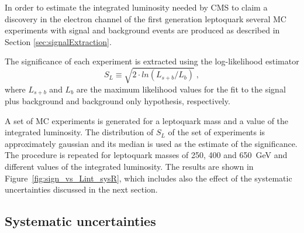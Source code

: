 \documentclass[colclass=cmspaper]{combine}
\begin{document}
\begin{linenumbers}
In order to estimate the integrated luminosity needed by CMS to claim 
a discovery in the electron channel of the first generation leptoquark
several MC experiments with signal and background events are produced
as described in Section \ref{sec:signalExtraction}.

The significance of each experiment is extracted using the log-likelihood estimator 
\begin{displaymath}
S_L \equiv \sqrt{2\cdot ln{(L_{s+b}/L_{b})}}~\mathrm{,}
\end{displaymath}
where $L_{s+b}$ and $L_b$ are the maximum likelihood values for the fit to
the signal plus background and background only hypothesis, respectively.

A set of MC experiments is generated for a leptoquark mass and a value of 
the integrated luminosity.
The distribution of $S_L$ of the set of experiments is approximately gaussian 
and its median is used as the estimate of the significance.
The procedure is repeated for leptoquark masses of 250, 400 and 650~GeV and
different values of the integrated luminosity. The results are shown in
Figure~\ref{fig:sign_vs_Lint_sysR}, which includes also the effect of the systematic 
uncertainties discussed in the next section. 



\subsection{Systematic uncertainties}


\end{linenumbers}
\end{document}
